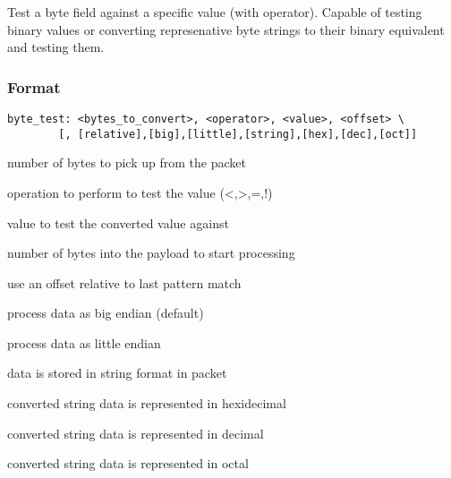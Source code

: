 \documentclass[english]{report}
\begin{document}
Test a byte field against a specific value (with operator).  Capable
 of testing binary values or converting represenative byte strings to
their binary equivalent and testing them.

\subsubsection{Format}

\begin{verbatim}
byte_test: <bytes_to_convert>, <operator>, <value>, <offset> \
        [, [relative],[big],[little],[string],[hex],[dec],[oct]]
\end{verbatim}

\begin{description}{}
\item [bytes\_to\_convert]number of bytes to pick up from the packet
\item [operator]operation to perform to test the value (<,>,=,!)
\item [value]value to test the converted value against
\item [offset]number of bytes into the payload to start processing
\item [relative]use an offset relative to last pattern match
\item [big]process data as big endian (default)
\item [little]process data as little endian
\item [string]data is stored in string format in packet
\item [hex]converted string data is represented in hexidecimal
\item [dec]converted string data is represented in decimal
\item [oct]converted string data is represented in octal
\end{description}
\end{document}
